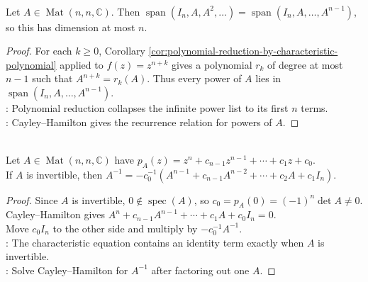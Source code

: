 \begin{corollary} \label{cor:powers-of-matrix-span-dimension-at-most-n} \\
Let $A\in\operatorname{Mat}(n,n,\mathbb{C})$. Then $\operatorname{span}(I_n,A,A^2,\ldots)=\operatorname{span}(I_n,A,\ldots,A^{n-1})$, so this has dimension at most $n$.
\begin{proof}
For each $k\geq0$, Corollary \ref{cor:polynomial-reduction-by-characteristic-polynomial} applied to $f(z)=z^{n+k}$ gives a polynomial $r_k$ of degree at most $n-1$ such that $A^{n+k}=r_k(A)$. Thus every power of $A$ lies in $\operatorname{span}(I_n,A,\ldots,A^{n-1})$.\\
: Polynomial reduction collapses the infinite power list to its first $n$ terms.\\
: Cayley--Hamilton gives the recurrence relation for powers of $A$.
\end{proof}
\end{corollary}

\begin{corollary} \label{cor:inverse-from-characteristic-polynomial} \\
Let $A\in\operatorname{Mat}(n,n,\mathbb{C})$ have $p_A(z)=z^n+c_{n-1}z^{n-1}+\cdots+c_1z+c_0$.\\
If $A$ is invertible, then $A^{-1}=-c_0^{-1}(A^{n-1}+c_{n-1}A^{n-2}+\cdots+c_2A+c_1I_n)$.
\begin{proof}
Since $A$ is invertible, $0\notin\operatorname{spec}(A)$, so $c_0=p_A(0)=(-1)^n\det A\neq0$.\\
Cayley--Hamilton gives $A^n+c_{n-1}A^{n-1}+\cdots+c_1A+c_0I_n=0$.\\
Move $c_0I_n$ to the other side and multiply by $-c_0^{-1}A^{-1}$.\\
: The characteristic equation contains an identity term exactly when $A$ is invertible.\\
: Solve Cayley--Hamilton for $A^{-1}$ after factoring out one $A$.
\end{proof}
\end{corollary}

